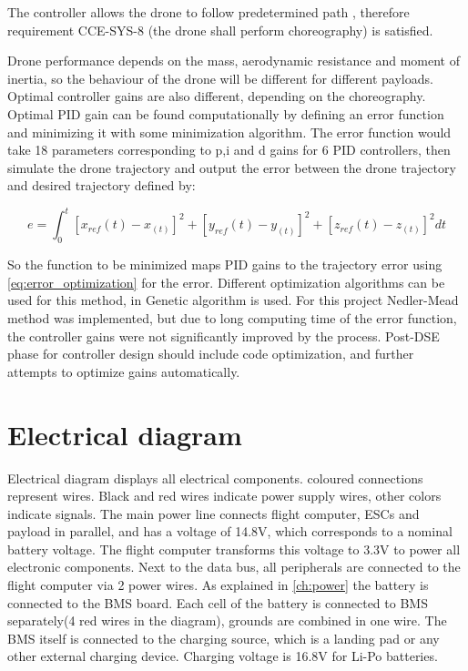 The controller allows the drone to follow predetermined path , therefore requirement CCE-SYS-8 (the drone shall perform choreography) is satisfied. 

Drone performance depends on the mass, aerodynamic resistance and moment of inertia, so the behaviour of the drone will be different for different payloads. Optimal controller gains are also different, depending on the choreography. Optimal PID gain can be found computationally by defining an error function and minimizing it with some minimization algorithm. 
The error function would take 18 parameters corresponding to p,i and d gains for 6 PID controllers, then simulate the drone trajectory  and output the error between the drone trajectory and desired trajectory defined by:

\begin{equation}
\label{eq:error_optimization}
    e = \int_0^t [x_{ref}(t) - x_(t)]^2 + [y_{ref}(t) - y_(t)]^2 + [z_{ref}(t) - z_(t)]^2 dt
\end{equation}

So the function to be minimized maps PID gains to the trajectory error using \autoref{eq:error_optimization} for the error. Different optimization algorithms can be used for this method, in \cite{pid_tuning} Genetic algorithm is used. For this project Nedler-Mead method\cite{nelder_mead_method} was implemented, but due to long computing time of the error function, the controller gains were not significantly improved by the process. Post-DSE phase for controller design should include code optimization, and further attempts to optimize gains automatically. 



\section{Electrical diagram} \label{sec:electrical_diagram}
Electrical diagram displays all electrical components. coloured connections represent wires. Black and red wires indicate power supply wires, other colors indicate signals. The main power line connects flight computer, ESCs and payload in parallel, and has a voltage of 14.8V, which corresponds to a nominal battery voltage. The flight computer transforms this voltage to 3.3V to power all electronic components. Next to the data bus, all peripherals are connected to the flight computer via 2 power wires. As explained in \autoref{ch:power} the battery is connected to the BMS board. Each cell of the battery is connected to BMS separately(4 red wires in the diagram), grounds are combined in one wire. The BMS itself is connected to the charging source, which is a landing pad or any other external charging device. Charging voltage is 16.8V for Li-Po batteries. 


